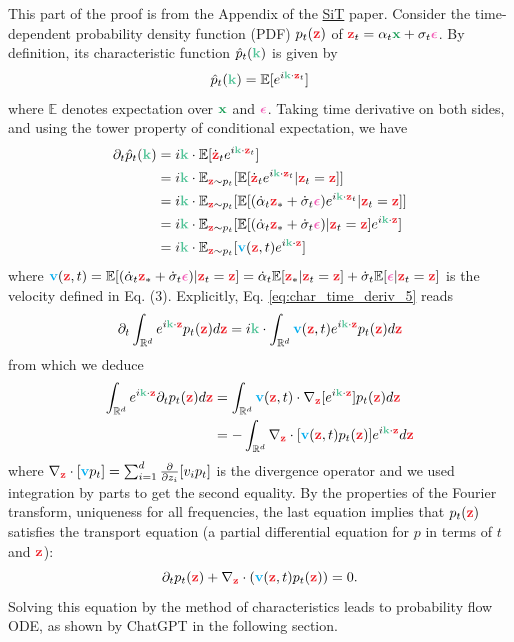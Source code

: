 \documentclass[usenames,dvipsnames]{article}
\newcommand{\myvec}[1]{\mathbf{#1}}
\newcommand{\myvecsym}[1]{\boldsymbol{#1}}
\newcommand{\vk}{\myvec{\textcolor{SeaGreen}{k}}}
\newcommand{\vx}{\myvec{\textcolor{ForestGreen}{x}}}
\newcommand{\vz}{\myvec{\textcolor{Red}{z}}}
\newcommand{\rvz}{\myvec{\textcolor{Red}{z}}}
\newcommand{\vv}{\myvec{\textcolor{Cyan}{v}}}
\newcommand{\vepsilon}{\myvecsym{\textcolor{CarnationPink}{\epsilon}}}
\begin{document}
This part of the proof is from the Appendix of the \href{https://arxiv.org/abs/2401.08740}{SiT} paper. Consider the time-dependent probability density function (PDF) $p_t(\vz)$ of $\vz_t = \alpha_t \vx + \sigma_t \vepsilon$. By definition, its characteristic function $\hat{p}_t(\vk)$ is given by
\begin{equation}
    \hat{p}_t(\vk) = \mathbb{E}[e^{i \vk \cdot \vz_t}]
\end{equation}
where $\mathbb{E}$ denotes expectation over $\vx$ and $\vepsilon$. Taking time derivative on both sides, and using the tower property of conditional expectation, we have
\begin{align}
    \partial_t \hat{p}_t(\vk) &= i \vk \cdot \mathbb{E}[\dot{\vz}_t e^{i \vk \cdot \vz_t}] \label{eq:char_time_deriv_1} \\
    &= i \vk \cdot \mathbb{E}_{\rvz \sim p_t} [\mathbb{E}[\dot{\vz}_t e^{i \vk \cdot \vz_t} | \vz_t = \vz]] \label{eq:char_time_deriv_2} \\
    &= i \vk \cdot \mathbb{E}_{\rvz \sim p_t} [\mathbb{E}[(\dot{\alpha}_t \rvz_* + \dot{\sigma}_t \vepsilon) e^{i \vk \cdot \vz_t} | \vz_t = \vz]] \label{eq:char_time_deriv_3} \\
    &= i \vk \cdot \mathbb{E}_{\rvz \sim p_t} [\mathbb{E}[(\dot{\alpha}_t \rvz_* + \dot{\sigma}_t \vepsilon) | \vz_t = \vz] e^{i \vk \cdot \vz}] \label{eq:char_time_deriv_4} \\
    &= i \vk \cdot \mathbb{E}_{\rvz \sim p_t} [\vv(\vz, t) e^{i \vk \cdot \vz}] \label{eq:char_time_deriv_5}
\end{align}
where $\vv(\vz, t) = \mathbb{E}[(\dot{\alpha}_t \rvz_* + \dot{\sigma}_t \vepsilon) | \vz_t = \vz] = \dot{\alpha}_t \mathbb{E}[\rvz_* | \vz_t = \vz] + \dot{\sigma}_t \mathbb{E}[\vepsilon | \vz_t = \vz]$ is the velocity defined in Eq. (3). Explicitly, Eq. \eqref{eq:char_time_deriv_5} reads
\begin{equation}
    \partial_t \int_{\mathbb{R}^d} e^{i \vk \cdot \vz} p_t(\vz) d\vz = i \vk \cdot \int_{\mathbb{R}^d} \vv(\vz, t) e^{i \vk \cdot \vz} p_t(\vz) d\vz
\end{equation}
from which we deduce
\begin{align}
    \int_{\mathbb{R}^d} e^{i \vk \cdot \vz} \partial_t p_t(\vz) d\vz &= \int_{\mathbb{R}^d} \vv(\vz, t) \cdot \nabla_{\vz} [e^{i \vk \cdot \vz}] p_t(\vz) d\vz \\
    &= -\int_{\mathbb{R}^d} \nabla_{\vz} \cdot [\vv(\vz, t) p_t(\vz)] e^{i \vk \cdot \vz} d\vz
\end{align}
where $\nabla_{\vz} \cdot [\vv p_t] = \sum_{i=1}^{d} \frac{\partial}{\partial z_i} [v_i p_t]$ is the divergence operator and we used integration by parts to get the second equality. By the properties of the Fourier transform, uniqueness for all frequencies, the last equation implies that $p_t(\vz)$ satisfies the transport equation (a partial differential equation for $p$ in terms of $t$ and $\vz$):
\begin{equation}
    \partial_t p_t(\vz) + \nabla_{\vz} \cdot (\vv(\vz, t) p_t(\vz)) = 0.
\end{equation}
Solving this equation by the method of characteristics leads to probability flow ODE, as shown by ChatGPT in the following section.
\end{document}
